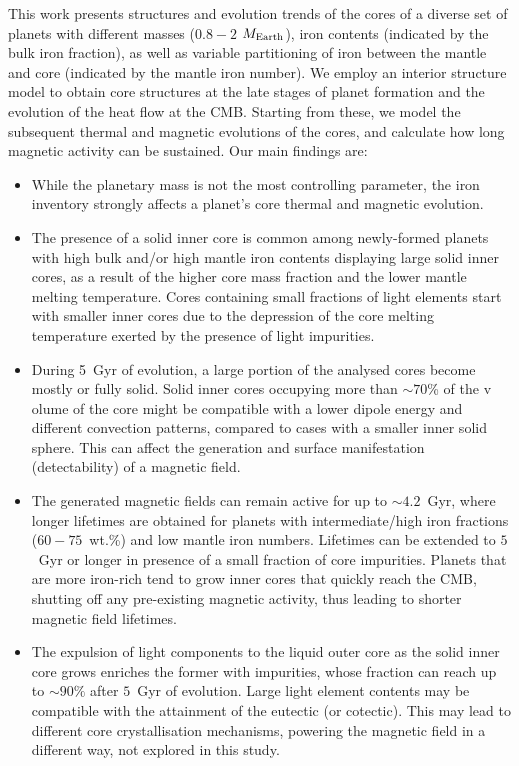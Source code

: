 \documentclass[draft]{agujournal2019} %
\begin{document}
This work presents structures and evolution trends of the cores of a diverse set of planets with different masses ($0.8-2$ $M_{\rm Earth}$), iron contents (indicated by the bulk iron fraction), as well as variable partitioning of iron between the mantle and core (indicated by the mantle iron number). We employ an interior structure model \cite{noacklasbleis_2020} to obtain core structures at the late stages of planet formation and the evolution of the heat flow at the CMB. Starting from these, we model the subsequent thermal and magnetic evolutions of the cores, and calculate how long magnetic activity can be sustained. Our main findings are:

\begin{itemize}
    \item {While the planetary mass is not the most controlling parameter, the iron inventory strongly affects a planet's core thermal and magnetic evolution.}
    \item{The presence of a solid inner core is common among newly-formed planets with high bulk and/or high mantle iron contents displaying large solid inner cores, as a result of the higher core mass fraction and the lower mantle melting temperature. Cores containing small fractions of light elements start with smaller inner cores due to the depression of the core melting temperature exerted by the presence of light impurities.}
    \item {During 5~Gyr of evolution, a large portion of the analysed cores become mostly or fully solid. 
    Solid inner cores occupying more than $\sim 70$\% of the v  olume of the core might be compatible with a lower dipole energy and different convection patterns, compared to cases with a smaller inner solid sphere. This can affect the generation and surface manifestation (detectability) of a magnetic field.} 
    \item {The generated magnetic fields can remain active for up to $\sim 4.2$~Gyr, where longer lifetimes are obtained for planets with intermediate/high iron fractions ($60-75$~wt.\%) and low mantle iron numbers. Lifetimes can be extended to $5$~Gyr or longer in presence of a small fraction of core impurities. Planets that are more iron-rich tend to grow inner cores that quickly reach the CMB, shutting off any pre-existing magnetic activity, thus leading to shorter magnetic field lifetimes.}
    \item{The expulsion of light components to the liquid outer core as the solid inner core grows enriches the former with impurities, whose fraction can reach up to $\sim 90\%$ after $5$~Gyr of evolution. Large light element contents may be compatible with the attainment of the eutectic (or cotectic). This may lead to different core crystallisation mechanisms, powering the magnetic field in a different way, not explored in this study.}

\end{itemize}
\end{document}
